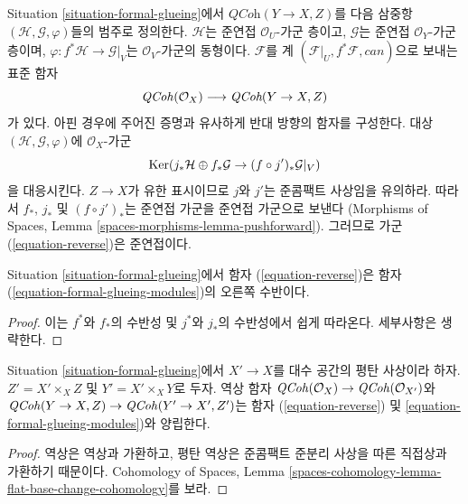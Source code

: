 \noindent
Situation \ref{situation-formal-glueing}에서
$\textit{QCoh}(Y \to X, Z)$를 다음 삼중항
$(\mathcal{H}, \mathcal{G}, \varphi)$들의 범주로 정의한다.
$\mathcal{H}$는 준연접 $\mathcal{O}_U$-가군 층이고,
$\mathcal{G}$는 준연접 $\mathcal{O}_Y$-가군 층이며,
$\varphi : f^*\mathcal{H} \to \mathcal{G}|_V$는
$\mathcal{O}_V$-가군의 동형이다. $\mathcal{F}$를 계
$(\mathcal{F}|_U, f^*\mathcal{F}, can)$으로 보내는 표준 함자
\begin{equation}
\label{equation-formal-glueing-modules}
\mathit{QCoh}(\mathcal{O}_X) \longrightarrow \textit{QCoh}(Y \to X, Z)
\end{equation}
가 있다. 아핀 경우에 주어진 증명과 유사하게 반대 방향의 함자를
구성한다. 대상 $(\mathcal{H}, \mathcal{G}, \varphi)$에
$\mathcal{O}_X$-가군
\begin{equation}
\label{equation-reverse}
\mathop{\mathrm{Ker}}(j_*\mathcal{H} \oplus f_*\mathcal{G} \to (f \circ j')_*\mathcal{G}|_V)
\end{equation}
을 대응시킨다. $Z \to X$가 유한 표시이므로 $j$와 $j'$는
준콤팩트 사상임을 유의하라. 따라서 $f_*$, $j_*$ 및
$(f \circ j')_*$는 준연접 가군을 준연접 가군으로 보낸다
(Morphisms of Spaces, Lemma
\ref{spaces-morphisms-lemma-pushforward}). 그러므로 가군
(\ref{equation-reverse})은 준연접이다.

\begin{lemma}
\label{lemma-adjoint}
Situation \ref{situation-formal-glueing}에서 함자
(\ref{equation-reverse})은 함자
(\ref{equation-formal-glueing-modules})의 오른쪽 수반이다.
\end{lemma}

\begin{proof}
이는 $f^*$와 $f_*$의 수반성 및 $j^*$와 $j_*$의 수반성에서 쉽게
따라온다. 세부사항은 생략한다.
\end{proof}

\begin{lemma}
\label{lemma-reverse-commutes-with-flat-base-change}
Situation \ref{situation-formal-glueing}에서 $X' \to X$를 대수 공간의
평탄 사상이라 하자. $Z' = X' \times_X Z$ 및
$Y' = X' \times_X Y$로 두자. 역상 함자
$\mathit{QCoh}(\mathcal{O}_X) \to \mathit{QCoh}(\mathcal{O}_{X'})$와
$\mathit{QCoh}(Y \to X, Z) \to \mathit{QCoh}(Y' \to X', Z')$는 함자
(\ref{equation-reverse}) 및
\ref{equation-formal-glueing-modules})와 양립한다.
\end{lemma}

\begin{proof}
역상은 역상과 가환하고, 평탄 역상은 준콤팩트 준분리 사상을 따른
직접상과 가환하기 때문이다. Cohomology of Spaces, Lemma
\ref{spaces-cohomology-lemma-flat-base-change-cohomology}를 보라.
\end{proof}

